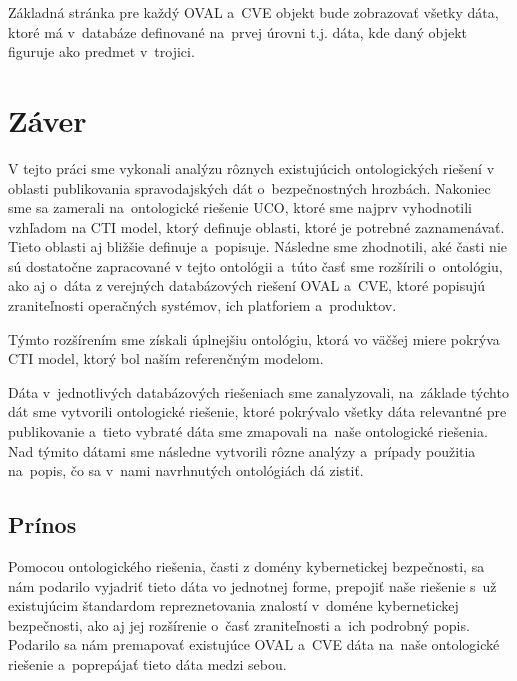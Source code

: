 \documentclass[12pt, a4paper, oneside]{book}
\begin{document}
Základná stránka pre každý OVAL a~CVE objekt bude zobrazovať všetky dáta, ktoré má v~databáze definované na~prvej úrovni t.j. dáta, kde daný objekt figuruje ako predmet v~trojici. 



\chapter{Záver}

V tejto práci sme vykonali analýzu rôznych existujúcich ontologických riešení v
oblasti publikovania spravodajských dát o~bezpečnostných hrozbách. Nakoniec sme
sa zamerali na~ontologické riešenie UCO, ktoré sme najprv vyhodnotili vzhľadom
na CTI model, ktorý definuje oblasti, ktoré je potrebné zaznamenávať. Tieto oblasti aj bližšie definuje a~popisuje. Následne sme zhodnotili, aké časti nie sú dostatočne zapracované
v tejto ontológii a~túto časť sme rozšírili o~ontológiu, ako aj o~dáta z
verejných databázových riešení OVAL a~CVE, ktoré popisujú zraniteľnosti
operačných systémov, ich platforiem a~produktov.


Týmto rozšírením sme získali úplnejšiu ontológiu, ktorá vo väčšej miere pokrýva CTI model, ktorý bol naším referenčným modelom.


Dáta v~jednotlivých databázových riešeniach sme zanalyzovali, na~základe týchto dát sme vytvorili ontologické riešenie, ktoré pokrývalo všetky dáta relevantné pre publikovanie a~tieto vybraté dáta sme zmapovali na~naše ontologické riešenia. Nad týmito dátami sme následne vytvorili rôzne analýzy a~prípady použitia na~popis, čo sa v~nami navrhnutých ontológiách dá zistiť.


\section*{Prínos}
Pomocou ontologického riešenia, časti z domény kybernetickej bezpečnosti, sa nám podarilo vyjadriť tieto dáta vo jednotnej forme, prepojiť naše riešenie s~už existujúcim štandardom repreznetovania znalostí v~doméne kybernetickej bezpečnosti, ako aj jej rozšírenie o~časť zraniteľnosti a~ich podrobný popis. Podarilo sa nám premapovať existujúce OVAL a~CVE dáta na~naše ontologické riešenie a~poprepájať tieto dáta medzi sebou.
\end{document}
